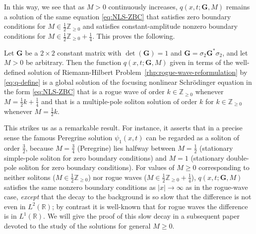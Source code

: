 In this way, we see that as $M>0$ continuously increases, $q(x,t;\mathbf{G},M)$ remains a solution of the same equation \eqref{eq:NLS-ZBC} that satisfies zero boundary conditions for $M\in\tfrac{1}{2}\mathbb{Z}_{\ge 0}$ and satisfies constant-amplitude nonzero boundary conditions for $M\in\tfrac{1}{2}\mathbb{Z}_{\ge 0}+\tfrac{1}{4}$.  This proves the following.
\begin{theorem}
Let $\mathbf{G}$ be a $2\times 2$ constant matrix with $\det(\mathbf{G})=1$ and $\mathbf{G}=\sigma_2\mathbf{G}^*\sigma_2$, and let $M>0$ be arbitrary.  Then the function $q(x,t;\mathbf{G},M)$ given in terms of the well-defined solution of Riemann-Hilbert Problem~\ref{rhp:rogue-wave-reformulation} by \eqref{eq:q-define} is a global solution of the focusing nonlinear Schr\"odinger equation in the form \eqref{eq:NLS-ZBC} that is a rogue wave of order $k\in\mathbb{Z}_{\ge 0}$ whenever $M=\tfrac{1}{2}k+\tfrac{1}{4}$ and that is a multiple-pole soliton solution of order $k$ for $k\in\mathbb{Z}_{\ge 0}$ whenever $M=\tfrac{1}{2}k$.
\label{thm:solution-family}
\end{theorem}

This strikes us as a remarkable result.  For instance, it asserts that in a precise sense the famous Peregrine solution $\psi_1(x,t)$ can be regarded as a soliton of order $\tfrac{3}{2}$, because $M=\tfrac{3}{4}$ (Peregrine) lies halfway between $M=\tfrac{1}{2}$ (stationary simple-pole soliton for zero boundary conditions) and $M=1$ (stationary double-pole soliton for zero boundary conditions).  
For values of $M\ge 0$ corresponding to neither solitons ($M\in\tfrac{1}{2}\mathbb{Z}_{\ge 0}$) nor rogue waves ($M\in\tfrac{1}{2}\mathbb{Z}_{\ge 0}+\tfrac{1}{4}$), $q(x,t;\mathbf{G},M)$ satisfies the same nonzero boundary conditions as $|x|\to\infty$ as in the rogue-wave case, \emph{except} that the decay to the background is so slow that the difference is not even in $L^2(\mathbb{R})$; by contrast it is well-known that for rogue waves the difference is in $L^1(\mathbb{R})$.  We will give the proof of this slow decay in a subsequent paper devoted to the study of the solutions for general $M\ge 0$.

